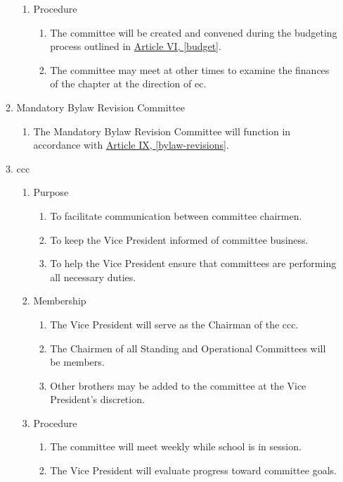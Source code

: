 \begin{enumerate}
\begin{enumerate}
\begin{enumerate}
					\item Procedure
						\begin{enumerate}
							\item The committee will be created and convened during the budgeting process outlined in \hyperref[budget]{Article VI, \autoref*{budget}}.
							\item The committee may meet at other times to examine the finances of the chapter at the direction of \gls{ec}.
						\end{enumerate}
				\end{enumerate}

			\item Mandatory Bylaw Revision Committee
				\begin{enumerate}
					\item The Mandatory Bylaw Revision Committee will function in accordance with \hyperref[bylaw-revisions]{Article IX, \autoref*{bylaw-revisions}}.
				\end{enumerate}

					

			\item \gls{ccc}
				\begin{enumerate}
					\item Purpose
						\begin{enumerate}
							\item To facilitate communication between committee chairmen.
							\item To keep the Vice President informed of committee business.
							\item To help the Vice President ensure that committees are performing all necessary duties.
						\end{enumerate}
					\item Membership
						\begin{enumerate}
							\item The Vice President will serve as the Chairman of the \gls{ccc}.
							\item The Chairmen of all Standing and Operational Committees will be members.
							\item Other brothers may be added to the committee at the Vice President's discretion.
						\end{enumerate}
					\item Procedure
						\begin{enumerate}
							\item The committee will meet weekly while school is in session.
							\item The Vice President will evaluate progress toward committee goals.
						\end{enumerate}	
				\end{enumerate}


\end{enumerate}
\end{enumerate}
